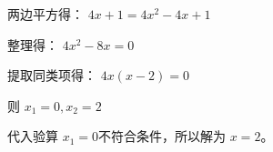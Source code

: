 \documentclass[answers]{exam}
\begin{document}
\begin{questions}
\begin{enumerate}[label=(\arabic*)]
\begin{solution}
			      两边平方得：
			      \begin{math}
				      4x + 1 = 4x^2 - 4x + 1
			      \end{math}

			      整理得：
			      \begin{math}
				      4x^2 -8x = 0
			      \end{math}

			      提取同类项得：
			      \begin{math}
				      4x(x-2) = 0
			      \end{math}

			      则
			      \begin{math}
				      x_1 = 0, x_2 = 2
			      \end{math}

			      代入验算 \( x_1 = 0  \)不符合条件，所以解为 \( x=2 \)。
		      \end{solution}
	\end{enumerate}
\end{questions}
\end{document}
